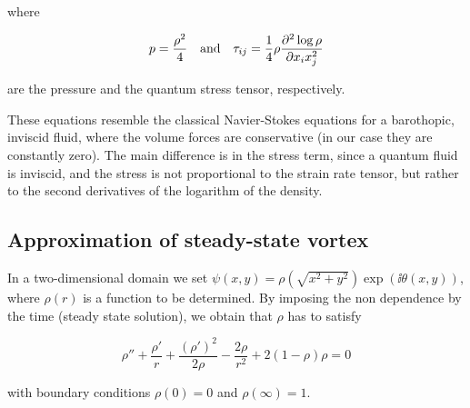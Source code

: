 where 

\[
    p = \frac{\rho^2}{4} \quad \text{and} \quad \tau_{ij} = \frac14 \rho \frac{\partial^{2} \log \rho}{\partial x_i x_j^{2}}
\]

are the pressure and the quantum stress tensor, respectively. 

These equations resemble the classical Navier-Stokes equations for a barothopic, inviscid fluid, where the volume forces are conservative (in our case they are constantly zero). The main difference is in the stress term, since a quantum fluid is inviscid, and the stress is not proportional to the strain rate tensor, but rather to the second derivatives of the logarithm of the density.

\subsection{Approximation of steady-state vortex}

In a two-dimensional domain we set $\psi(x,y) = \rho\left(\sqrt{x^2 + y^2}\right)\exp\left(\ii \theta(x,y)\right)$, where $\rho(r)$ is a function to be determined. By imposing the non dependence by the time (steady state solution), we obtain that $\rho$ has to satisfy

\begin{equation}
    \rho'' + \frac{\rho'}{r} + \frac{(\rho')^2}{2\rho} - \frac{2\rho}{r^2} + 2(1 - \rho)\rho = 0
    \label{eq:density}
\end{equation}

with boundary conditions $\rho(0) = 0$ and $\rho(\infty) = 1$.


